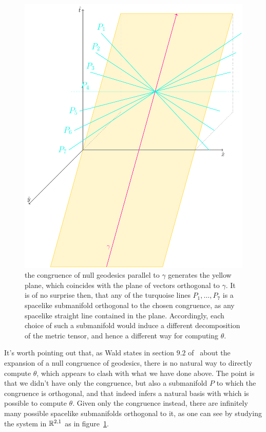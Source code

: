 \begin{figure}
	\caption[]{the congruence of null geodesics parallel to \(\gamma\) generates the yellow plane, which coincides with the plane of vectors orthogonal to \(\gamma\). It is of no surprise then, that any of the turquoise lines \(P_1, \ldots, P_7\) is a spacelike submanifold orthogonal to the chosen congruence, as any spacelike straight line contained in the plane. Accordingly, each choice of such a submanifold would induce a different decomposition of the metric tensor, and hence a different way for computing \(\theta\).}
	\label{fig:expansion-computation}
	\centering
	\includegraphics[scale=0.55]{Immagini/expansion-computation/expansion-computation.pdf}
\end{figure}

\begin{remark}
	It's worth pointing out that, as Wald states in section \(9.2\) of~\cite{wald2010general} about the expansion of a null congruence of geodesics, there is no natural way to directly compute \(\theta\), which appears to clash with what we have done above. The point is that we didn't have only the congruence, but also a submanifold \(P\) to which the congruence is orthogonal, and that indeed infers a natural basis with which is possible to compute \(\theta\). Given only the congruence instead, there are infinitely many possible spacelike submanifolds orthogonal to it, as one can see by studying the system in \({\mathbb{R}}^{2,1}\) as in figure~\ref{fig:expansion-computation}.
\end{remark}

